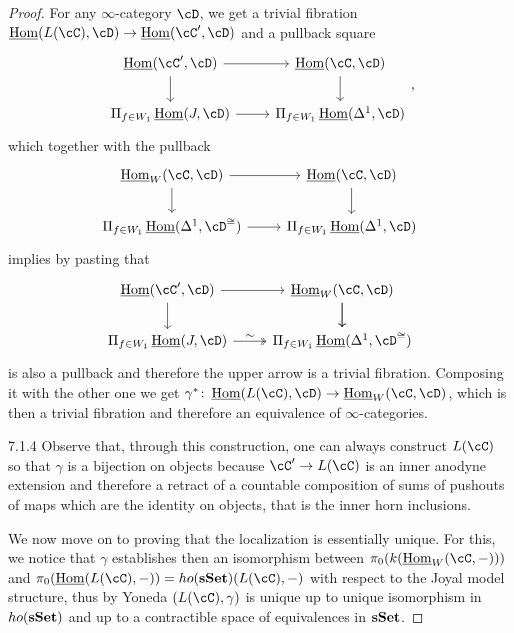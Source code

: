 \documentclass[a4paper,fontsize=12pt]{scrartcl}
\begin{document}
\begin{proof}
  For any $\infty$-category $\cD$, we get a trivial fibration
  $\Home(L(\cC),\cD)\rightarrow\Home(\cC',\cD)$ and a pullback square
  \[\begin{tikzcd}
    {\Home(\cC',\cD)} & {\Home(\cC,\cD)} \\
    {\Pi_{f\in W_1}\Home(J,\cD)} & {\Pi_{f\in W_1}\Home(\Delta^1,\cD)}
    \arrow[from=1-2, to=2-2]
    \arrow[from=2-1, to=2-2]
    \arrow[from=1-1, to=2-1]
    \arrow[from=1-1, to=1-2]
  \end{tikzcd},\]
  which together with the pullback
  \[\begin{tikzcd}
    {\Home_W(\cC,\cD)} & {\Home(\cC,\cD)} \\
    {\Pi_{f\in W_1}\Home(\Delta^1,\cD^{\cong})} & {\Pi_{f\in W_1}\Home(\Delta^1,\cD)}
    \arrow[from=1-2, to=2-2]
    \arrow[from=2-1, to=2-2]
    \arrow[from=1-1, to=2-1]
    \arrow[from=1-1, to=1-2]
  \end{tikzcd}\]
  implies by pasting that
  \[\begin{tikzcd}
    {\Home(\cC',\cD)} & {\Home_W(\cC,\cD)} \\
    {\Pi_{f\in W_1}\Home(J,\cD)} & {\Pi_{f\in W_1}\Home(\Delta^1,\cD^{\cong})}
    \arrow[from=1-2, to=2-2]
    \arrow[from=1-1, to=1-2]
    \arrow[from=1-1, to=2-1]
    \arrow["\sim", two heads, from=2-1, to=2-2]
    \arrow[from=1-2, to=2-2]
  \end{tikzcd}\]
  is also a pullback and therefore the upper arrow is a trivial fibration.
  Composing it with the other one we get
  $\gamma^*\colon\Home(L(\cC),\cD)\rightarrow\Home_W(\cC,\cD)$, which is then a
  trivial fibration and therefore an equivalence of $\infty$-categories.

  7.1.4 Observe that, through this construction, one can always construct
  $L(\cC)$ so that $\gamma$ is a bijection on objects because $\cC'\rightarrow
  L(\cC)$ is an inner anodyne extension and therefore a retract of a countable
  composition of sums of pushouts of maps which are the identity on objects,
  that is the inner horn inclusions.

  We now move on to proving that the localization is essentially unique. For
  this, we notice that $\gamma$ establishes then an isomorphism between
  $\pi_0(k(\Home_W(\cC,-)))$ and $\pi_0(\Home(L(\cC),-))=ho(\sSet)(L(\cC),-)$
  with respect to the Joyal model structure, thus by Yoneda $(L(\cC),\gamma)$ is
  unique up to unique isomorphism in $ho(\operatorname{\mathbf{sSet}})$ and up to a contractible space
  of equivalences in $\operatorname{\mathbf{sSet}}$.
\end{proof}
\end{document}
